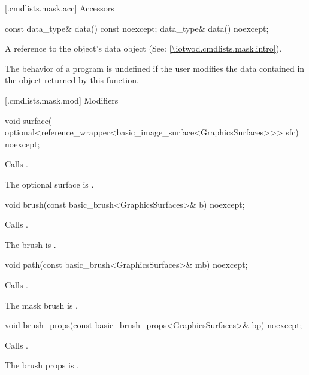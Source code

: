  [\iotwod.cmdlists.mask.acc] {Accessors}%

%
\begin{itemdecl}
const data_type& data() const noexcept;
data_type& data() noexcept;
\end{itemdecl}
\begin{itemdescr}
\pnum
\returns A reference to the  object's data object (See: \ref{\iotwod.cmdlists.mask.intro}).

\pnum
\remarks The behavior of a program is undefined if the user modifies the data contained in the  object returned by this function.
\end{itemdescr}

 [\iotwod.cmdlists.mask.mod] {Modifiers}%

%
\begin{itemdecl}
void surface(
  optional<reference_wrapper<basic_image_surface<GraphicsSurfaces>>> sfc) 
  noexcept;
\end{itemdecl}
\begin{itemdescr}
\pnum
\effects Calls .

\pnum
\remarks The optional surface is .
\end{itemdescr}

%
\begin{itemdecl}
void brush(const basic_brush<GraphicsSurfaces>& b) noexcept;
\end{itemdecl}
\begin{itemdescr}
\pnum
\effects Calls .

\pnum
\remarks The brush is .
\end{itemdescr}

%
\begin{itemdecl}
void path(const basic_brush<GraphicsSurfaces>& mb) noexcept;
\end{itemdecl}
\begin{itemdescr}
\pnum
\effects Calls .

\pnum
\remarks The mask brush is .
\end{itemdescr}

%
\begin{itemdecl}
void brush_props(const basic_brush_props<GraphicsSurfaces>& bp) noexcept;
\end{itemdecl}
\begin{itemdescr}
\pnum
\effects Calls .

\pnum
\remarks The brush props is .
\end{itemdescr}

